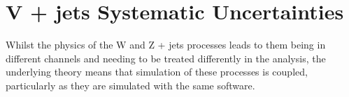 

\section{V + jets Systematic Uncertainties}
\label{sec:vjets}
Whilst the physics of the W and Z + jets processes leads to them being in
different channels and needing to be treated differently in the analysis, the
underlying theory means that simulation of these processes is coupled,
particularly as they are simulated with the same software.

